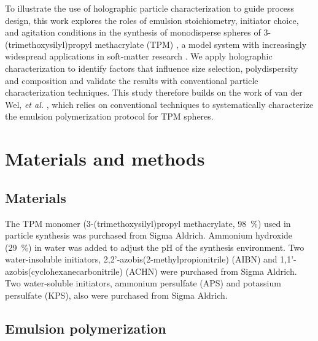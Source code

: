 \documentclass[journal=langd5,manuscript=article,layout=twocolumn]{achemso}
\begin{document}
To illustrate the use of holographic particle characterization
to guide process design, this work
explores the roles of emulsion stoichiometry, initiator choice, and
agitation conditions in the synthesis of monodisperse spheres of
3-(trimethoxysilyl)propyl methacrylate (TPM) \cite{vanderwel17},
a model system with increasingly widespread applications
in soft-matter research \cite{sacanna11,liu16,vanderwel18}.
We apply holographic characterization
to identify factors that influence size selection, polydispersity
and composition and validate the results with conventional particle
characterization techniques.
This study therefore builds on the work of van der Wel, \emph{et al.} \cite{vanderwel17},
which relies on conventional techniques to systematically
characterize the emulsion polymerization protocol for TPM spheres.

\section{Materials and methods}
\label{sec:experimental}

\subsection{Materials}
\label{sec:materials}
The TPM monomer (3-(trimethoxysilyl)propyl methacrylate, \SI{98}{\percent})
used in particle synthesis was purchased from Sigma Aldrich. 
Ammonium hydroxide (\SI{29}{\percent}) in water was added to adjust
the pH of the synthesis environment.
Two water-insoluble initiators, 2,2'-azobis(2-methylpropionitrile) (AIBN)
and 1,1'-azobis(cyclohexanecarbonitrile) (ACHN)
were purchased from Sigma Aldrich.
Two water-soluble initiators, 
ammonium persulfate (APS) and potassium persulfate (KPS),
also were purchased from Sigma Aldrich.


\subsection{Emulsion polymerization}
\label{ssec:polymerization}

\end{document}
